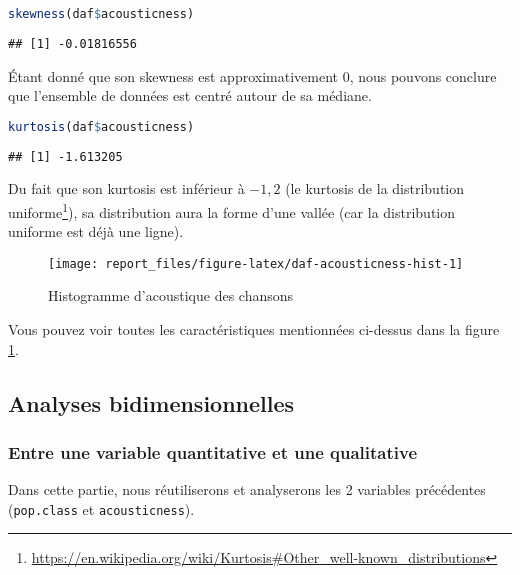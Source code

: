 \documentclass[
  11pt,
  xcolor = usenames,dvipsnames]{article}
\newcommand{\passthrough}[1]{#1}
\begin{document}
\begin{lstlisting}[language=R]
skewness(daf$acousticness)
\end{lstlisting}

\begin{lstlisting}
## [1] -0.01816556
\end{lstlisting}

Étant donné que son skewness est approximativement 0, nous pouvons conclure que
l'ensemble de données est centré autour de sa médiane.

\begin{lstlisting}[language=R]
kurtosis(daf$acousticness)
\end{lstlisting}

\begin{lstlisting}
## [1] -1.613205
\end{lstlisting}

Du fait que son kurtosis est inférieur à \(-1,2\) (le kurtosis de la distribution uniforme\footnote{\url{https://en.wikipedia.org/wiki/Kurtosis\#Other_well-known_distributions}}),
sa distribution aura la forme d'une vallée (car la distribution uniforme est déjà une ligne).

\begin{figure}

{\centering \texttt{[image: report\_files/figure-latex/daf-acousticness-hist-1]} 

}

\caption{Histogramme d'acoustique des chansons}\label{fig:daf-acousticness-hist}
\end{figure}

Vous pouvez voir toutes les caractéristiques mentionnées ci-dessus dans la figure \ref{fig:daf-acousticness-hist}.

\hypertarget{analyses-bidimensionnelles}{%
\subsection{Analyses bidimensionnelles}\label{analyses-bidimensionnelles}}

\hypertarget{entre-une-variable-quantitative-et-une-qualitative}{%
\subsubsection{Entre une variable quantitative et une qualitative}\label{entre-une-variable-quantitative-et-une-qualitative}}

Dans cette partie, nous réutiliserons et analyserons les 2 variables précédentes (\passthrough{\lstinline!pop.class!} et \passthrough{\lstinline!acousticness!}).
\end{document}
